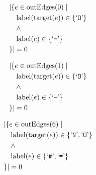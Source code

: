 \begin{align*}
&|\{e \in \mathrm{outEdges}(0)  \mid \\
&\quad \mathrm{label}(\mathrm{target}(e)) \in \{ \text{`\texttt{O}'} \}\\
&\quad \wedge\\
&\quad \mathrm{label}(e) \in \{ \text{`\texttt{-}'} \}\\
&\}| = 0
\end{align*}

\begin{align*}
&|\{e \in \mathrm{outEdges}(1)  \mid \\
&\quad \mathrm{label}(\mathrm{target}(e)) \in \{ \text{`\texttt{O}'} \}\\
&\quad \wedge\\
&\quad \mathrm{label}(e) \in \{ \text{`\texttt{-}'} \}\\
&\}| = 0
\end{align*}

\begin{align*}
&|\{e \in \mathrm{outEdges}(6)  \mid \\
&\quad \mathrm{label}(\mathrm{target}(e)) \in \{ \text{`\texttt{N}'},  \text{`\texttt{O}'} \}\\
&\quad \wedge\\
&\quad \mathrm{label}(e) \in \{ \text{`\texttt{\#}'},  \text{`\texttt{=}'} \}\\
&\}| = 0
\end{align*}

